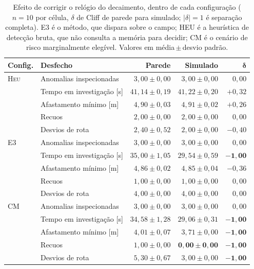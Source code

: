 \begin{table}[htb]
\centering
\caption{Efeito de corrigir o relógio do decaimento, dentro de cada configuração
($n=10$ por célula, $\delta$ de Cliff de parede para simulado; $|\delta|=1$ é separação
completa). E3 é o método, que dispara sobre o campo; HEU é a heurística de detecção
bruta, que não consulta a memória para decidir; CM é o cenário de risco marginalmente
elegível. Valores em média\,$\pm$\,desvio padrão.}
\label{tab:res-relogio}
\scriptsize
\setlength{\tabcolsep}{4pt}
\begin{tabular}{llrrr}
\hline
\textbf{Config.} & \textbf{Desfecho} & \textbf{Parede} & \textbf{Simulado} &
$\bm{\delta}$\\
\hline
\textsc{Heu} & Anomalias inspecionadas   & $3{,}00\pm0{,}00$ & $3{,}00\pm0{,}00$ & $0{,}00$\\
             & Tempo em investigação [s] & $41{,}14\pm0{,}19$ & $41{,}22\pm0{,}20$ & $+0{,}32$\\
             & Afastamento mínimo [m]    & $4{,}90\pm0{,}03$ & $4{,}91\pm0{,}02$ & $+0{,}26$\\
             & Recuos                    & $2{,}00\pm0{,}00$ & $2{,}00\pm0{,}00$ & $0{,}00$\\
             & Desvios de rota           & $2{,}40\pm0{,}52$ & $2{,}00\pm0{,}00$ & $-0{,}40$\\
\hline
E3           & Anomalias inspecionadas   & $3{,}00\pm0{,}00$ & $3{,}00\pm0{,}00$ & $0{,}00$\\
             & Tempo em investigação [s] & $35{,}00\pm1{,}05$ & $29{,}54\pm0{,}59$ & $\bm{-1{,}00}$\\
             & Afastamento mínimo [m]    & $4{,}86\pm0{,}02$ & $4{,}85\pm0{,}04$ & $-0{,}36$\\
             & Recuos                    & $1{,}00\pm0{,}00$ & $1{,}00\pm0{,}00$ & $0{,}00$\\
             & Desvios de rota           & $4{,}00\pm0{,}00$ & $4{,}00\pm0{,}00$ & $0{,}00$\\
\hline
CM           & Anomalias inspecionadas   & $3{,}00\pm0{,}00$ & $3{,}00\pm0{,}00$ & $0{,}00$\\
             & Tempo em investigação [s] & $34{,}58\pm1{,}28$ & $29{,}06\pm0{,}31$ & $\bm{-1{,}00}$\\
             & Afastamento mínimo [m]    & $4{,}01\pm0{,}07$ & $3{,}71\pm0{,}00$ & $\bm{-1{,}00}$\\
             & Recuos                    & $1{,}00\pm0{,}00$ & $\bm{0{,}00\pm0{,}00}$ & $\bm{-1{,}00}$\\
             & Desvios de rota           & $5{,}30\pm0{,}67$ & $3{,}00\pm0{,}00$ & $\bm{-1{,}00}$\\
\hline
\end{tabular}
\end{table}

